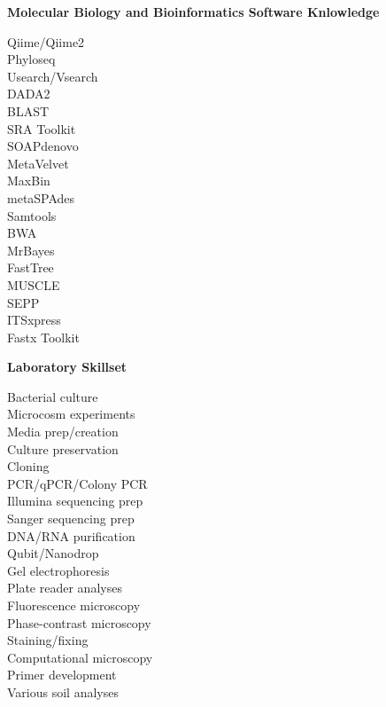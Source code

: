\documentclass{article}
\begin{document}
\vspace{3mm}
{\large  \textbf{Molecular Biology and Bioinformatics Software Knlowledge}}
  \begin{adjustwidth}{2mm}{}\begin{multicols}{3}
    Qiime/Qiime2\\
    Phyloseq\\
    Usearch/Vsearch\\
    DADA2\\
    BLAST\\
    SRA Toolkit\\
    SOAPdenovo\\
    MetaVelvet\\
    MaxBin\\
    metaSPAdes\\
    Samtools\\
    BWA\\
    MrBayes\\
    FastTree\\
    MUSCLE\\
    SEPP\\
    ITSxpress\\
    Fastx Toolkit
  \end{multicols}\end{adjustwidth}

\vspace{3mm}
{\large  \textbf{Laboratory Skillset}}
  \begin{adjustwidth}{2mm}{}\begin{multicols}{3}
    Bacterial culture\\
    Microcosm experiments\\
    Media prep/creation\\
    Culture preservation\\
    Cloning\\
    PCR/qPCR/Colony PCR\\
    Illumina sequencing prep\\
    Sanger sequencing prep\\
    DNA/RNA purification\\
    Qubit/Nanodrop\\
    Gel electrophoresis\\
    Plate reader analyses\\
    Fluorescence microscopy\\
    Phase-contrast microscopy\\
    Staining/fixing\\
    Computational microscopy\\
    Primer development\\
    Various soil analyses
  \end{multicols}\end{adjustwidth}
\end{document}
